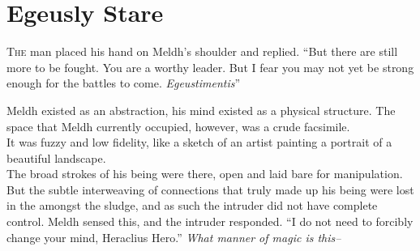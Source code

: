 \chapter{Egeusly Stare}
\lettrine{T}{he} man placed his hand on Meldh’s shoulder and replied. “But there are still more to be fought. You are a worthy leader. But I fear you may not yet be strong enough for the battles to come. \emph{Egeustimentis}”
\simpleline
\begin{flushright}
Meldh existed as an abstraction, his mind existed as a physical structure. The space that Meldh currently occupied, however, was a crude facsimile.\\It was fuzzy and low fidelity, like a sketch of an artist painting a portrait of a beautiful landscape.\\The broad strokes of his being were there, open and laid bare for manipulation. But the subtle interweaving of connections that truly made up his being were lost in the amongst the sludge, and as such the intruder did not have complete control. Meldh sensed this, and the intruder responded.
\SmallVSpace
“I do not need to forcibly change your mind, Heraclius Hero.”
\SmallVSpace
\emph{What manner of magic is this\mbox{--}}


\end{flushright}
